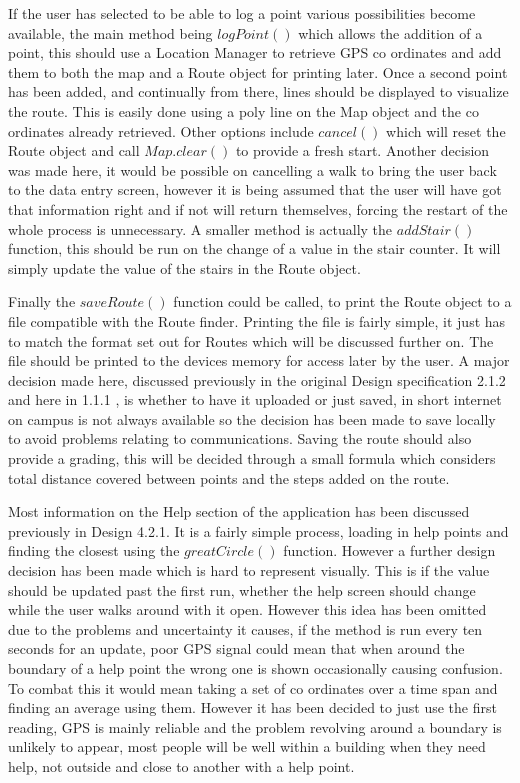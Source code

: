 If the user has selected to be able to log a point various possibilities become available, the main method being $logPoint()$ which allows the addition of a point, this should use a Location Manager to retrieve GPS co ordinates and add them to both the map and a Route object for printing later. Once a second point has been added, and continually from there, lines should be displayed to visualize the route. This is easily done using a poly line on the Map object and the co ordinates already retrieved. Other options include $cancel()$ which will reset the Route object and call $Map.clear()$ to provide a fresh start. Another decision was made here, it would be possible on cancelling a walk to bring the user back to the data entry screen, however it is being assumed that the user will have got that information right and if not will return themselves, forcing the restart of the whole process is unnecessary. A smaller method is actually the $addStair()$ function, this should be run on the change of a value in the stair counter. It will simply update the value of the stairs in the Route object. 

Finally the $saveRoute()$ function could be called, to print the Route object to a file compatible with the Route finder. Printing the file is fairly simple, it just has to match the format set out for Routes which will be discussed further on. The file should be printed to the devices memory\cite{storage} for access later by the user. A major decision made here, discussed previously in the original Design specification 2.1.2 and here in 1.1.1 , is whether to have it uploaded or just saved, in short internet on campus is not always available so the decision has been made to save locally to avoid problems relating to communications. Saving the route should also provide a grading, this will be decided through a small formula which considers total distance covered between points and the steps added on the route. 

Most information on the Help section of the application has been discussed previously in Design 4.2.1. It is a fairly simple process, loading in help points and finding the closest using the $greatCircle()$\cite{circle} function. However a further design decision has been made which is hard to represent visually. This is if the value should be updated past the first run, whether the help screen should change while the user walks around with it open. However this idea has been omitted due to the problems and uncertainty it causes, if the method is run every ten seconds for an update, poor GPS signal could mean that when around the boundary of a help point the wrong one is shown occasionally causing confusion. To combat this it would mean taking a set of co ordinates over a time span and finding an average using them. However it has been decided to just use the first reading, GPS is mainly reliable\cite{accuracy} and the problem revolving around a boundary is unlikely to appear, most people will be well within a building when they need help, not outside and close to another with a help point. 

